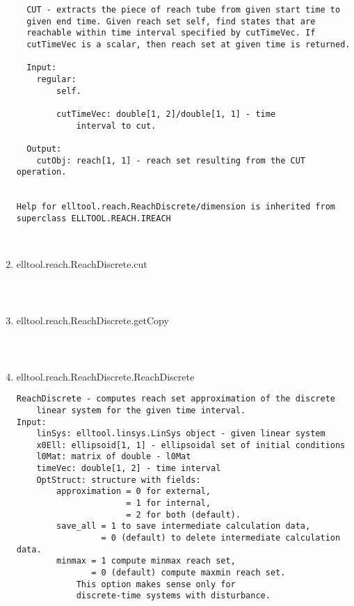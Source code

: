 \begin{enumerate}
\begin{lstlisting}
  CUT - extracts the piece of reach tube from given start time to
  given end time. Given reach set self, find states that are
  reachable within time interval specified by cutTimeVec. If
  cutTimeVec is a scalar, then reach set at given time is returned.

  Input:
    regular:
        self.

        cutTimeVec: double[1, 2]/double[1, 1] - time
            interval to cut.

  Output:
    cutObj: reach[1, 1] - reach set resulting from the CUT operation.


Help for elltool.reach.ReachDiscrete/dimension is inherited from superclass ELLTOOL.REACH.IREACH



\end{lstlisting}
\fontfamily{\familydefault}
\selectfont
\item {elltool.reach.ReachDiscrete.cut}
\selectfont
\begin{lstlisting}



\end{lstlisting}
\fontfamily{\familydefault}
\selectfont
\item {elltool.reach.ReachDiscrete.getCopy}
\selectfont
\begin{lstlisting}



\end{lstlisting}
\fontfamily{\familydefault}
\selectfont
\item {elltool.reach.ReachDiscrete.ReachDiscrete}
\selectfont
\begin{lstlisting}
ReachDiscrete - computes reach set approximation of the discrete
    linear system for the given time interval.
Input:
    linSys: elltool.linsys.LinSys object - given linear system
    x0Ell: ellipsoid[1, 1] - ellipsoidal set of initial conditions
    l0Mat: matrix of double - l0Mat
    timeVec: double[1, 2] - time interval
    OptStruct: structure with fields:
        approximation = 0 for external,
                      = 1 for internal,
                      = 2 for both (default).
        save_all = 1 to save intermediate calculation data,
                 = 0 (default) to delete intermediate calculation data.
        minmax = 1 compute minmax reach set,
               = 0 (default) compute maxmin reach set.
            This option makes sense only for
            discrete-time systems with disturbance.


\end{lstlisting}
\end{enumerate}
